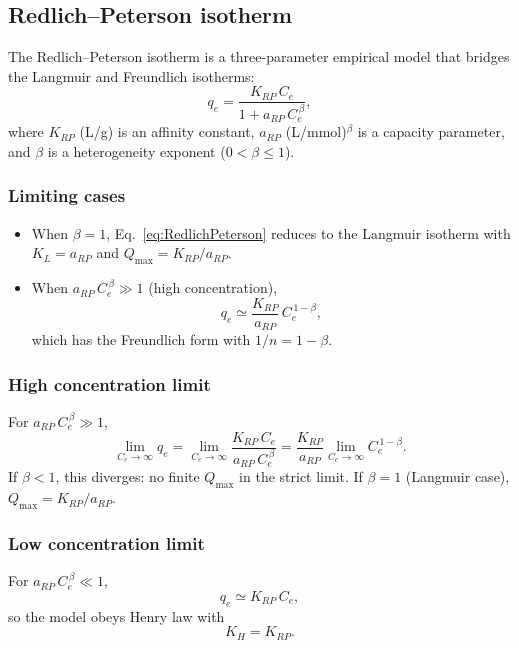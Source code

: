 \documentclass[12pt]{article}
\begin{document}
	
	\subsection{Redlich--Peterson isotherm}

	The Redlich--Peterson isotherm is a three-parameter empirical model
	that bridges the Langmuir and Freundlich isotherms:
	\begin{equation}
		q_e = \frac{K_{RP}\, C_e}{1 + a_{RP}\, C_e^{\,\beta}},
		\label{eq:RedlichPeterson}
	\end{equation}
	where $K_{RP}$ (L/g) is an affinity constant, $a_{RP}$
	(L/mmol)$^{\beta}$ is a capacity parameter, and $\beta$ is a
	heterogeneity exponent ($0 < \beta \leq 1$).

	\subsubsection{Limiting cases}

	\begin{itemize}
		\item When $\beta = 1$, Eq.~\eqref{eq:RedlichPeterson} reduces to
		the Langmuir isotherm with $K_L = a_{RP}$ and
		$Q_{\max} = K_{RP}/a_{RP}$.

		\item When $a_{RP}\,C_e^{\,\beta} \gg 1$ (high concentration),
		\[
		q_e \simeq \frac{K_{RP}}{a_{RP}}\, C_e^{\,1-\beta},
		\]
		which has the Freundlich form with $1/n = 1 - \beta$.
	\end{itemize}

	\subsubsection{High concentration limit}

	For $a_{RP}\,C_e^{\,\beta} \gg 1$,
	\begin{equation}
		\lim_{C_e \to \infty} q_e
		= \lim_{C_e \to \infty} \frac{K_{RP}\, C_e}{a_{RP}\, C_e^{\,\beta}}
		= \frac{K_{RP}}{a_{RP}} \lim_{C_e \to \infty} C_e^{\,1-\beta}.
	\end{equation}
	If $\beta < 1$, this diverges: no finite $Q_{\max}$ in the strict
	limit. If $\beta = 1$ (Langmuir case), $Q_{\max} = K_{RP}/a_{RP}$.

	\subsubsection{Low concentration limit}

	For $a_{RP}\,C_e^{\,\beta} \ll 1$,
	\begin{equation}
		q_e \simeq K_{RP}\, C_e,
	\end{equation}
	so the model obeys Henry law with
	\begin{equation}
		\boxed{K_H = K_{RP}.}
	\end{equation}
\end{document}
